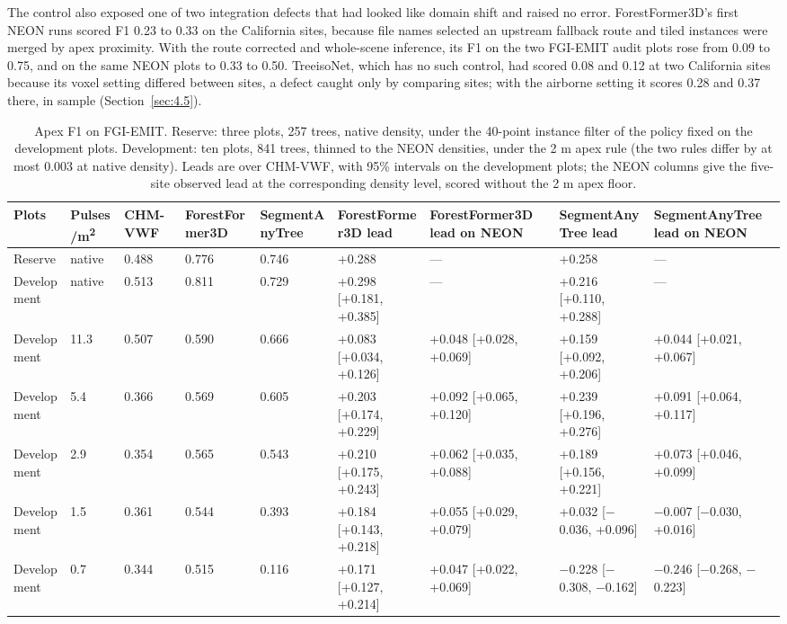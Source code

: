 \documentclass[journal]{IEEEtran}
\begin{document}
The control also exposed one of two integration defects that had looked like
domain shift and raised no error. ForestFormer3D's first NEON runs scored F1
0.23 to 0.33 on the California sites, because file names selected an upstream
fallback route and tiled instances were merged by apex proximity. With the route
corrected and whole-scene inference, its F1 on the two FGI-EMIT audit plots rose
from 0.09 to 0.75, and on the same NEON plots to 0.33 to 0.50. TreeisoNet, which
has no such control, had scored 0.08 and 0.12 at two California sites because
its voxel setting differed between sites, a defect caught only by comparing
sites; with the airborne setting it scores 0.28 and 0.37 there, in sample
(Section~\ref{sec:4.5}).

\begin{table}[!tp]
\caption{Apex F1 on FGI-EMIT. Reserve: three plots, 257 trees, native
density, under the 40-point instance filter of the policy fixed on the
development plots. Development: ten plots, 841 trees, thinned to the NEON
densities, under the 2 m apex rule (the two rules differ by at most 0.003 at
native density). Leads are over CHM-VWF, with 95\% intervals on the development
plots; the NEON columns give the five-site observed lead at the corresponding
density level, scored without the 2 m apex floor.}
\label{tab:6}
\centering
\scriptsize
\setlength{\tabcolsep}{3pt}
\renewcommand{\arraystretch}{1.15}
\begin{tabularx}{\textwidth}{lllLLLLLL}
\hline
Plots & Pulses/m\textsuperscript{2} & CHM-VWF & ForestFormer3D & SegmentAnyTree & ForestFormer3D lead & ForestFormer3D lead on NEON & SegmentAnyTree lead & SegmentAnyTree lead on NEON \\
\hline
Reserve & native & 0.488 & 0.776 & 0.746 & +0.288 & --- & +0.258 & --- \\
Development & native & 0.513 & 0.811 & 0.729 & +0.298 [+0.181, +0.385] & --- & +0.216 [+0.110, +0.288] & --- \\
Development & 11.3 & 0.507 & 0.590 & 0.666 & +0.083 [+0.034, +0.126] & +0.048 [+0.028, +0.069] & +0.159 [+0.092, +0.206] & +0.044 [+0.021, +0.067] \\
Development & 5.4 & 0.366 & 0.569 & 0.605 & +0.203 [+0.174, +0.229] & +0.092 [+0.065, +0.120] & +0.239 [+0.196, +0.276] & +0.091 [+0.064, +0.117] \\
Development & 2.9 & 0.354 & 0.565 & 0.543 & +0.210 [+0.175, +0.243] & +0.062 [+0.035, +0.088] & +0.189 [+0.156, +0.221] & +0.073 [+0.046, +0.099] \\
Development & 1.5 & 0.361 & 0.544 & 0.393 & +0.184 [+0.143, +0.218] & +0.055 [+0.029, +0.079] & +0.032 [$-$0.036, +0.096] & $-$0.007 [$-$0.030, +0.016] \\
Development & 0.7 & 0.344 & 0.515 & 0.116 & +0.171 [+0.127, +0.214] & +0.047 [+0.022, +0.069] & $-$0.228 [$-$0.308, $-$0.162] & $-$0.246 [$-$0.268, $-$0.223] \\
\hline
\end{tabularx}
\end{table}
\end{document}
